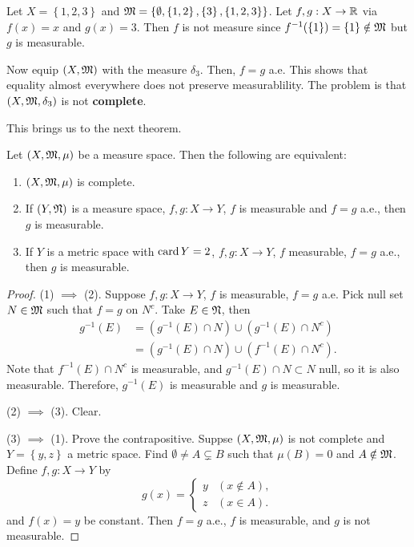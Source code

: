 \documentclass[a4paper]{article}
\begin{document}
\begin{eg}
  Let $X = \left\{ 1,2,3 \right\}$ and $\mathfrak{M} =
  \left\{ \emptyset, \left\{ 1, 2 \right\},
  \left\{ 3 \right\}, \left\{ 1, 2, 3 \right\} \right\}$.
  Let $f, g: X \to \mathbb{R}$ via $f(x) = x$ and $g(x) = 3$.
  Then $f$ is not measure since $f^{-1} (\left\{ 1 \right\})
  = \left\{ 1 \right\} \notin \mathfrak{M}$ but $g$ is measurable.

  Now equip $(X, \mathfrak{M})$ with the measure $\delta_3$.
  Then, $f = g$ a.e. This shows that equality almost
  everywhere does not preserve measurablility.
  The problem is that $(X, \mathfrak{M}, \delta_3)$ is not
  \textbf{complete}.
\end{eg}

This brings us to the next theorem.

\begin{thm}
Let $(X, \mathfrak{M}, \mu)$ be a measure space. Then the following
are equivalent:
\begin{enumerate}
  \item $(X, \mathfrak{M}, \mu)$ is complete.
  \item If $(Y, \mathfrak{N})$ is a measure space, $f, g : X
  \to Y$, $f$ is measurable and $f = g$ a.e., then
  $g$ is measurable.
  \item If $Y$ is a metric space with $\operatorname{card} Y = 2$,
  $f, g: X \to Y$, $f$ measurable, $f = g$ a.e.,
  then $g$ is measurable.
\end{enumerate}
\end{thm}

\begin{proof}

(1) $\implies$ (2). Suppose $f, g: X \to Y$, $f$ is measurable,
$f = g$ a.e. Pick null set $N \in \mathfrak{M}$ such that
$f = g$ on $N^c$. Take $E \in \mathfrak{N}$, then
\[
\begin{aligned}
  g^{-1}(E)
  &= (g^{-1}(E) \cap N) \cup (g^{-1} (E) \cap N^c) \\
  &= (g^{-1}(E) \cap N) \cup (f^{-1} (E) \cap N^c).
\end{aligned}
\]
Note that $f^{-1}(E) \cap N^c$ is measurable,
and $g^{-1}(E) \cap N \subset N$ null, so it is also measurable.
Therefore, $g^{-1}(E)$ is measurable and $g$ is measurable.

(2) $\implies$ (3). Clear.

(3) $\implies$ (1). Prove the contrapositive.
Suppse $(X, \mathfrak{M}, \mu)$ is not complete and
$Y = \left\{ y, z \right\}$ a metric space.
Find $\emptyset \neq A \subsetneq B$ such that
$\mu(B) = 0$ and $A \notin \mathfrak{M}$. Define $f, g :
X \to Y$ by
\[
g(x) = \begin{cases}
  y & (x \notin A), \\
  z & (x \in A).
\end{cases}
\]
and $f(x) = y$ be constant. Then $f = g$ a.e.,
$f$ is measurable, and $g$ is not measurable.

\end{proof}
\end{document}
